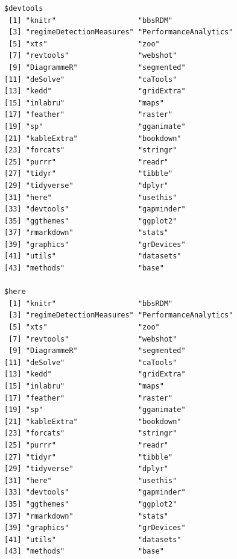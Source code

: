 \documentclass[12pt,twoside,openany]{reedthesis}
\begin{document}
\begin{verbatim}
$devtools
 [1] "knitr"                   "bbsRDM"                 
 [3] "regimeDetectionMeasures" "PerformanceAnalytics"   
 [5] "xts"                     "zoo"                    
 [7] "revtools"                "webshot"                
 [9] "DiagrammeR"              "segmented"              
[11] "deSolve"                 "caTools"                
[13] "kedd"                    "gridExtra"              
[15] "inlabru"                 "maps"                   
[17] "feather"                 "raster"                 
[19] "sp"                      "gganimate"              
[21] "kableExtra"              "bookdown"               
[23] "forcats"                 "stringr"                
[25] "purrr"                   "readr"                  
[27] "tidyr"                   "tibble"                 
[29] "tidyverse"               "dplyr"                  
[31] "here"                    "usethis"                
[33] "devtools"                "gapminder"              
[35] "ggthemes"                "ggplot2"                
[37] "rmarkdown"               "stats"                  
[39] "graphics"                "grDevices"              
[41] "utils"                   "datasets"               
[43] "methods"                 "base"                   

$here
 [1] "knitr"                   "bbsRDM"                 
 [3] "regimeDetectionMeasures" "PerformanceAnalytics"   
 [5] "xts"                     "zoo"                    
 [7] "revtools"                "webshot"                
 [9] "DiagrammeR"              "segmented"              
[11] "deSolve"                 "caTools"                
[13] "kedd"                    "gridExtra"              
[15] "inlabru"                 "maps"                   
[17] "feather"                 "raster"                 
[19] "sp"                      "gganimate"              
[21] "kableExtra"              "bookdown"               
[23] "forcats"                 "stringr"                
[25] "purrr"                   "readr"                  
[27] "tidyr"                   "tibble"                 
[29] "tidyverse"               "dplyr"                  
[31] "here"                    "usethis"                
[33] "devtools"                "gapminder"              
[35] "ggthemes"                "ggplot2"                
[37] "rmarkdown"               "stats"                  
[39] "graphics"                "grDevices"              
[41] "utils"                   "datasets"               
[43] "methods"                 "base"                   


\end{verbatim}
\end{document}
